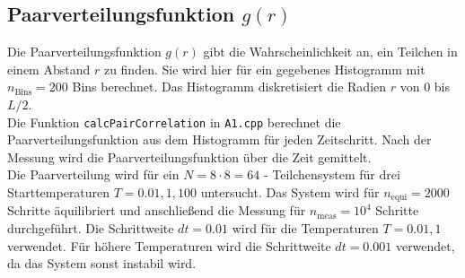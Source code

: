\subsection{Paarverteilungsfunktion $g(r)$}
Die Paarverteilungsfunktion $g(r)$ gibt die Wahrscheinlichkeit an, ein Teilchen in einem Abstand $r$ zu finden.
Sie wird hier für ein gegebenes Histogramm mit $n_\text{Bins}=200$ Bins berechnet.
Das Histogramm diskretisiert die Radien $r$ von $0$ bis $L/2$.
\\
Die Funktion \texttt{calcPairCorrelation} in \texttt{A1.cpp} berechnet die Paarverteilungsfunktion aus dem Histogramm für jeden Zeitschritt.
Nach der Messung wird die Paarverteilungsfunktion über die Zeit gemittelt.
\\

Die Paarverteilung wird für ein $N=8 \cdot 8 = 64$ - Teilchensystem für drei Starttemperaturen $T=0.01, 1, 100$ untersucht.
Das System wird für $n_\text{equi}=2000$ Schritte äquilibriert und anschließend die Messung für $n_\text{meas}=10^4$ Schritte durchgeführt.
Die Schrittweite $dt=0.01$ wird für die Temperaturen $T=0.01, 1$ verwendet.
Für höhere Temperaturen wird die Schrittweite $dt=0.001$ verwendet, da das System sonst instabil wird.


